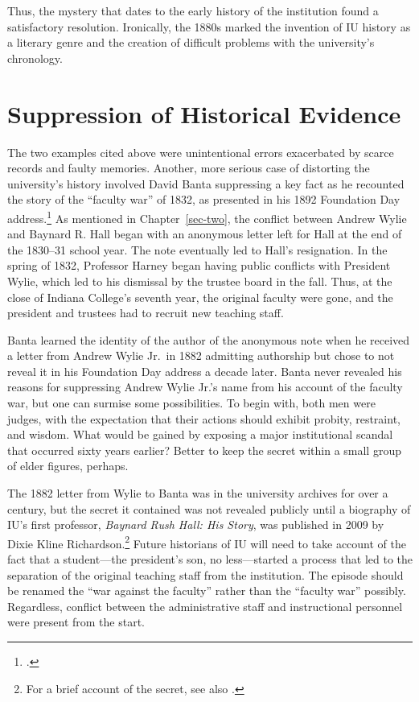 \documentclass[
  american,
  letterpaper,
]{scrreprt}
\begin{document}
Thus, the mystery that dates to the early history of the institution
found a satisfactory resolution. Ironically, the 1880s marked the
invention of IU history as a literary genre and the creation of
difficult problems with the university's chronology.

\section{Suppression of Historical
Evidence}\label{suppression-of-historical-evidence}

The two examples cited above were unintentional errors exacerbated by
scarce records and faulty memories. Another, more serious case of
distorting the university's history involved David Banta suppressing a
key fact as he recounted the story of the ``faculty war'' of 1832, as
presented in his 1892 Foundation Day address.\footnote{.} As mentioned in
Chapter~\ref{sec-two}, the conflict between Andrew Wylie and Baynard R.
Hall began with an anonymous letter left for Hall at the end of the
1830--31 school year. The note eventually led to Hall's resignation. In
the spring of 1832, Professor Harney began having public conflicts with
President Wylie, which led to his dismissal by the trustee board in the
fall. Thus, at the close of Indiana College's seventh year, the original
faculty were gone, and the president and trustees had to recruit new
teaching staff.

Banta learned the identity of the author of the anonymous note when he
received a letter from Andrew Wylie Jr.~in 1882 admitting authorship but
chose to not reveal it in his Foundation Day address a decade later.
Banta never revealed his reasons for suppressing Andrew Wylie Jr.'s name
from his account of the faculty war, but one can surmise some
possibilities. To begin with, both men were judges, with the expectation
that their actions should exhibit probity, restraint, and wisdom. What
would be gained by exposing a major institutional scandal that occurred
sixty years earlier? Better to keep the secret within a small group of
elder figures, perhaps.

The 1882 letter from Wylie to Banta was in the university archives for
over a century, but the secret it contained was not revealed publicly
until a biography of IU's first professor, \emph{Baynard Rush Hall: His
Story}, was published in 2009 by Dixie Kline Richardson.\footnote{For a
  brief account of the secret, see also
  .} Future historians of IU will need
to take account of the fact that a student---the president's son, no
less---started a process that led to the separation of the original
teaching staff from the institution. The episode should be renamed the
``war against the faculty'' rather than the ``faculty war'' possibly.
Regardless, conflict between the administrative staff and instructional
personnel were present from the start.
\end{document}
